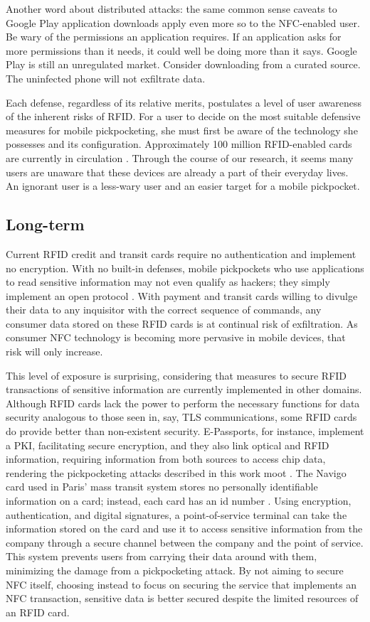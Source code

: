 \documentclass{IEEEtran}
\begin{document}
Another word about distributed attacks: the same common sense caveats to Google Play application downloads apply even more so to the NFC-enabled user.  Be wary of the permissions an application requires.  If an application asks for more permissions than it needs, it could well be doing more than it says.  Google Play is still an unregulated market.  Consider downloading from a curated source.  The uninfected phone will not exfiltrate data.  

Each defense, regardless of its relative merits, postulates a level of user awareness of the inherent risks of RFID.  For a user to decide on the most suitable defensive measures for mobile pickpocketing, she must first be aware of the technology she possesses and its configuration.  Approximately 100 million RFID-enabled cards are currently in circulation \cite{forbes-1}.  Through the course of our research, it seems many users are unaware that these devices are already a part of their everyday lives.  An ignorant user is a less-wary user and an easier target for a mobile pickpocket.

\subsection{Long-term}
Current RFID credit and transit cards require no authentication and implement no encryption.  With no built-in defenses, mobile pickpockets who use applications to read sensitive information may not even qualify as hackers; they simply implement an open protocol \cite{bt-hacking-nfc-ccs}.  With payment and transit cards willing to divulge their data to any inquisitor with the correct sequence of commands, any consumer data stored on these RFID cards is at continual risk of exfiltration.  As consumer NFC technology is becoming more pervasive in mobile devices, that risk will only increase.

This level of exposure is surprising, considering that measures to secure RFID transactions of sensitive information are currently implemented in other domains.  Although RFID cards lack the power to perform the necessary functions for data security analogous to those seen in, say, TLS communications, some RFID cards do provide better than non-existent security.  E-Passports, for instance, implement a PKI, facilitating secure encryption, and they also link optical and RFID information, requiring information from both sources to access chip data, rendering the pickpocketing attacks described in this work moot \cite{security-privacy-epassports}.  The Navigo card used in Paris' mass transit system stores no personally identifiable information on a card; instead, each card has an id number \cite{bt-hacking-nfc-ccs}.  Using encryption, authentication, and digital signatures, a point-of-service terminal can take the information stored on the card and use it to access sensitive information from the company through a secure channel between the company and the point of service.  This system prevents users from carrying their data around with them, minimizing the damage from a pickpocketing attack.  By not aiming to secure NFC itself, choosing instead to focus on securing the service that implements an NFC transaction, sensitive data is better secured despite the limited resources of an RFID card.  
\end{document}
